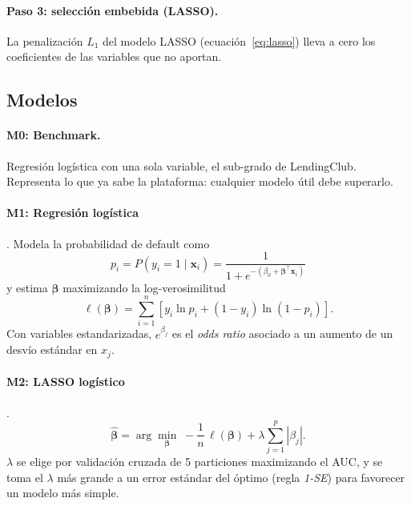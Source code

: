 \documentclass{article}
\begin{document}
\paragraph{Paso 3: selección embebida (LASSO).} La penalización $L_1$ del modelo
LASSO (ecuación~\ref{eq:lasso}) lleva a cero los coeficientes de las variables
que no aportan.

\subsection{Modelos}

\paragraph{M0: Benchmark.} Regresión logística con una sola variable, el sub-grado
de LendingClub. Representa lo que ya sabe la plataforma: cualquier modelo útil
debe superarlo.

\paragraph{M1: Regresión logística} \cite{hosmer2013}. Modela la probabilidad de
default como
\begin{equation}
p_i = P(y_i = 1 \mid \mathbf{x}_i) = \frac{1}{1 + e^{-(\beta_0 + \boldsymbol{\beta}^\top \mathbf{x}_i)}}
\end{equation}
y estima $\boldsymbol\beta$ maximizando la log-verosimilitud
\begin{equation}
\ell(\boldsymbol\beta) = \sum_{i=1}^{n} \left[ y_i \ln p_i + (1-y_i)\ln(1-p_i) \right].
\end{equation}
Con variables estandarizadas, $e^{\beta_j}$ es el \emph{odds ratio} asociado a un
aumento de un desvío estándar en $x_j$.

\paragraph{M2: LASSO logístico} \cite{tibshirani1996,friedman2010}.
\begin{equation}
\hat{\boldsymbol\beta} = \arg\min_{\boldsymbol\beta} \; -\frac{1}{n}\,\ell(\boldsymbol\beta)
+ \lambda \sum_{j=1}^{p} |\beta_j| .
\label{eq:lasso}
\end{equation}
$\lambda$ se elige por validación cruzada de 5 particiones maximizando el AUC, y
se toma el $\lambda$ más grande a un error estándar del óptimo (regla
\emph{1-SE}) para favorecer un modelo más simple.
\end{document}
